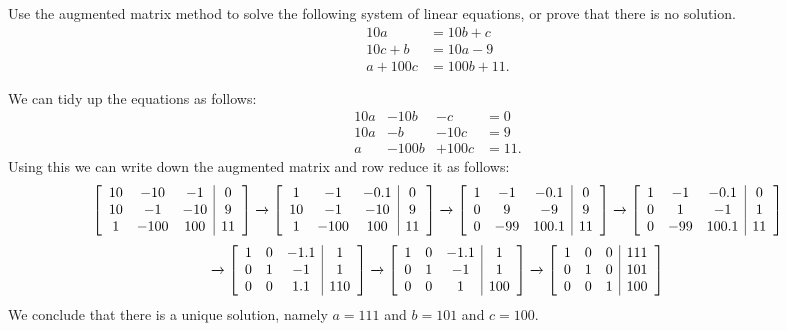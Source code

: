 \documentclass[a4paper]{amsart}
\renewenvironment{solution}{\SolutionInline}{\endSolutionInline}
\begin{document}
\begin{exercise}\label{ex-solve-i}
 Use the augmented matrix method to solve the following system of
 linear equations, or prove that there is no solution.
 \begin{align*}
  10a &= 10b+c \\
  10c+b &= 10a-9 \\
  a+100c &= 100b+11.
 \end{align*}
\end{exercise}
\begin{solution}
 We can tidy up the equations as follows:
 \[ \begin{array}{rrrl}
     10a & -10b & -c &= 0 \\
     10a & -b & -10c &= 9 \\
     a & -100b & +100c &= 11. 
    \end{array}
 \]
 Using this we can write down the augmented matrix and row reduce it
 as follows:
 \[ 
  \left[\begin{array}{ccc|c}
   10 & -10 & -1 & 0 \\
   10 & -1 & -10 & 9 \\
   1 & -100 & 100 & 11 
  \end{array}\right]
  \xrightarrow{}
  \left[\begin{array}{ccc|c}
   1 & -1 & -0.1 & 0 \\
   10 & -1 & -10 & 9 \\
   1 & -100 & 100 & 11 
  \end{array}\right]
  \xrightarrow{}
  \left[\begin{array}{ccc|c}
   1 & -1 & -0.1 & 0 \\
   0 & 9 & -9 & 9 \\
   0 & -99 & 100.1 & 11 
  \end{array}\right]
  \xrightarrow{}
  \left[\begin{array}{ccc|c}
   1 & -1 & -0.1 & 0 \\
   0 & 1 & -1 & 1 \\
   0 & -99 & 100.1 & 11 
  \end{array}\right]
 \] \[
  \xrightarrow{}
  \left[\begin{array}{ccc|c}
   1 & 0 & -1.1 & 1 \\
   0 & 1 & -1 & 1 \\
   0 & 0 & 1.1 & 110 
  \end{array}\right]
  \xrightarrow{}
  \left[\begin{array}{ccc|c}
   1 & 0 & -1.1 & 1 \\
   0 & 1 & -1 & 1 \\
   0 & 0 & 1 & 100 
  \end{array}\right]
  \xrightarrow{}
  \left[\begin{array}{ccc|c}
   1 & 0 & 0 & 111 \\
   0 & 1 & 0 & 101 \\
   0 & 0 & 1 & 100 
  \end{array}\right]
 \]
 We conclude that there is a unique solution, namely $a=111$ and
 $b=101$ and $c=100$.
\end{solution}
\end{document}
